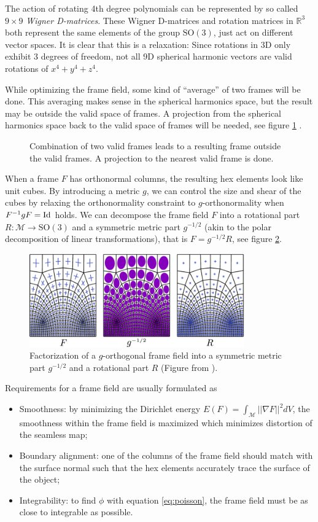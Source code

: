 \documentclass[../thesis.tex]{subfiles}
\begin{document}
The action of rotating 4th degree polynomials can be represented by so called $9\times9$ \emph{Wigner D-matrices}.
These Wigner D-matrices and rotation matrices in $\mathbb{R}^3$ both represent the
same elements of the group $\mathrm{SO}(3)$, just act on different vector spaces.
It is clear that this is a relaxation: Since rotations in 3D only exhibit 3 degrees of freedom, not all 9D spherical harmonic vectors are valid rotations
of $x^4+y^4+z^4$.

While optimizing the frame field, some kind of ``average'' of two frames will be done.
This averaging makes sense in the spherical harmonics space, but the result may be outside the valid
space of frames. A projection from the spherical
harmonics space back to the valid space of frames will be needed, see figure \ref{fig:projection} \cite{Ray}.
\begin{figure}[htb]
  \centering
  \def\svgwidth{30em}
  
  \caption{Combination of two valid frames leads to a resulting frame outside the valid frames. A projection to the nearest valid frame is done.}
  \label{fig:projection}
\end{figure}


When a frame $F$ has orthonormal columns, the resulting hex elements look like unit cubes.
By introducing a metric $g$, we can control the size and shear of the cubes by
relaxing the orthonormality constraint to $g$-orthonormality when
$F^{-1}gF = \operatorname{Id}$
holds. We can decompose the frame field $F$ into a rotational part $R : \mathcal{M} \to \text{SO}(3)$ and a symmetric metric part $g^{-1/2}$
(akin to the polar decomposition of linear transformations)\cite{Panozzo}, that is $F = g^{-1/2}R$,
see figure \ref{fig:factorization}.
\begin{figure}[htb]
  \centering
  \includegraphics[width=25em]{figures/factorization}
  \caption{Factorization of a $g$-orthogonal frame field into a symmetric metric part $g^{-1/2}$ and a rotational part $R$
  (Figure from \cite{Fang23}).}
  \label{fig:factorization}
\end{figure}
Requirements for a frame field are usually formulated as
\begin{itemize}
  \item Smoothness: by minimizing the Dirichlet energy $E(F)=\int_{\mathcal{M}}||\nabla F||^2 dV $, the smoothness within the frame field is maximized which minimizes distortion of the seamless map;
  \item Boundary alignment: one of the columns of the frame field should match with the surface normal such that the hex elements accurately trace the surface of the object;
  \item Integrability: to find $\phi$ with equation \ref{eq:poisson}, the frame field must be as close to integrable as possible.
\end{itemize}
\end{document}
